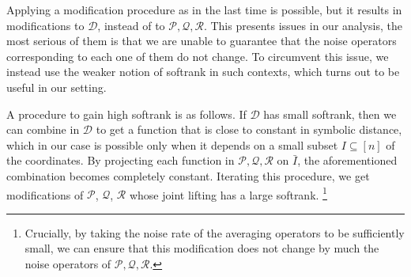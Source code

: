 \documentclass[10pt,a4paper]{amsart}
\begin{document}
\begin{enumerate}
    
    Applying a modification procedure as in the last time is possible, but it results in modifications to $\mathcal{D}$, instead of to  $\mathcal{P},\mathcal{Q},\mathcal{R}$. This presents issues in our analysis, the most serious of them is that we are unable to guarantee that the noise operators corresponding to each one of them do not change. %
    To circumvent this issue, we instead use the weaker notion of softrank in such contexts, which turns out to be useful in our setting. 
    
    A procedure to gain high softrank is as follows. If $\mathcal{D}$ has small softrank, then we can combine in $\mathcal{D}$ to get a function that is close to constant in symbolic distance, which in our case is possible only when it depends on a small subset  $I\subseteq [n]$ of the coordinates. By projecting each function in $\mathcal{P},\mathcal{Q},\mathcal{R}$ on $\bar{I}$, the aforementioned combination becomes completely constant. Iterating this procedure, we get modifications of $\mathcal{P}$, $\mathcal{Q}$, $\mathcal{R}$ whose joint lifting has a large softrank.
    \footnote{Crucially, by taking the noise rate of the averaging operators to be sufficiently small, we can ensure that this modification does not change by much the noise operators of $\mathcal{P},\mathcal{Q},\mathcal{R}$.}
\end{enumerate}
\end{document}
